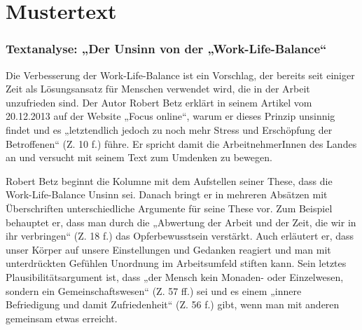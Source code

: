 
\section{Mustertext}
\subsubsection{Textanalyse: „Der Unsinn von der „Work-Life-Balance“}
Die Verbesserung der Work-Life-Balance ist ein Vorschlag, der bereits seit einiger Zeit als Lösungsansatz für Menschen verwendet wird, die in der Arbeit unzufrieden sind. Der Autor Robert Betz erklärt in seinem Artikel vom 20.12.2013 auf der Website „Focus online“, warum er dieses Prinzip unsinnig findet und es „letztendlich jedoch zu noch mehr Stress und Erschöpfung der Betroffenen“ (Z. 10 f.) führe. Er spricht damit die ArbeitnehmerInnen des Landes an und versucht mit seinem Text zum Umdenken zu bewegen.  

Robert Betz beginnt die Kolumne mit dem Aufstellen seiner These, dass die Work-Life-Balance Unsinn sei. Danach bringt er in mehreren Absätzen mit Überschriften unterschiedliche Argumente für seine These vor. Zum Beispiel behauptet er, dass man durch die „Abwertung der Arbeit und der Zeit, die wir in ihr verbringen“ (Z. 18 f.) das Opferbewusstsein verstärkt. Auch erläutert er, dass unser Körper auf unsere Einstellungen und Gedanken reagiert und man mit unterdrückten Gefühlen Unordnung im Arbeitsumfeld stiften kann. Sein letztes Plausibilitätsargument ist, dass „der Mensch kein Monaden- oder Einzelwesen, sondern ein Gemeinschaftswesen“ (Z. 57 ff.) sei und es einem „innere Befriedigung und damit Zufriedenheit“ (Z. 56 f.) gibt, wenn man mit anderen gemeinsam etwas erreicht.  

